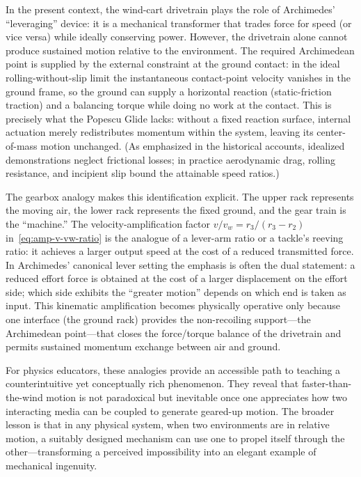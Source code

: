 \documentclass[a4paper]{article}
\begin{document}
In the present context, the wind-cart drivetrain plays the role of Archimedes'
``leveraging'' device: it is a mechanical transformer that trades force for
speed (or vice versa) while ideally conserving power. However, the drivetrain
alone cannot produce sustained motion relative to the environment. The required
Archimedean point is supplied by the external constraint at the ground contact:
in the ideal rolling-without-slip limit the instantaneous contact-point
velocity vanishes in the ground frame, so the ground can supply a horizontal
reaction (static-friction traction) and a balancing torque while doing no work
at the contact. This is precisely what the Popescu Glide lacks: without a fixed
reaction surface, internal actuation merely redistributes momentum within the
system, leaving its center-of-mass motion unchanged. (As emphasized in the
historical accounts, idealized demonstrations neglect frictional losses; in
practice aerodynamic drag, rolling resistance, and incipient slip bound the
attainable speed ratios.)

The gearbox analogy makes this identification explicit. The upper rack
represents the moving air, the lower rack represents the fixed ground, and the
gear train is the ``machine.'' The velocity-amplification factor
$v/v_w = r_3/(r_3-r_2)$ in~\eqref{eq:amp-v-vw-ratio} is the analogue of a lever-arm ratio or a tackle's
reeving ratio: it achieves a larger output speed at the cost of a reduced
transmitted force. In Archimedes' canonical lever setting the emphasis is
often the dual statement: a reduced effort force is obtained at the cost of a
larger displacement on the effort side; which side exhibits the ``greater
motion'' depends on which end is taken as input. This kinematic amplification
becomes physically operative only because one interface (the ground rack)
provides the non-recoiling support---the Archimedean point---that closes the
force/torque balance of the drivetrain and permits sustained momentum exchange
between air and ground.

For physics educators, these analogies provide an accessible path to teaching a
counterintuitive yet conceptually rich phenomenon. They reveal that
faster-than-the-wind motion is not paradoxical but inevitable once one
appreciates how two interacting media can be coupled to generate geared-up
motion. The broader lesson is that in any physical system, when two
environments are in relative motion, a suitably designed mechanism can use one
to propel itself through the other---transforming a perceived impossibility
into an elegant example of mechanical ingenuity.
\end{document}
